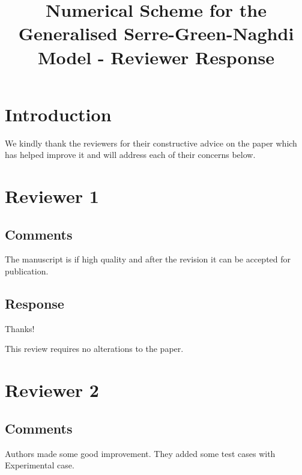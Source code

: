 \documentclass[10pt]{article}
\begin{document}
	\title{Numerical Scheme for the Generalised Serre-Green-Naghdi Model - Reviewer Response}
	
	\maketitle

\section{Introduction}

We kindly thank the reviewers for their constructive advice on the paper which has helped improve it and will address each of their concerns below.
	
\section{Reviewer 1}
\subsection{Comments}
The manuscript is if high quality and after the revision it can be accepted for publication.
\subsection{Response}
Thanks!

This review requires no alterations to the paper.


\section{Reviewer 2}
\subsection{Comments}
Authors made some good improvement. They added some test cases with Experimental case.
\end{document}
